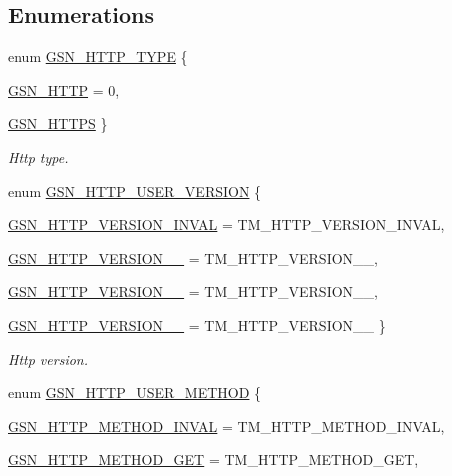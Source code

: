 \subsection*{Enumerations}
\begin{DoxyCompactItemize}
\item 
enum \hyperlink{a00665_ga918ab72c19100d330e6d4854b0ac0612}{GSN\_\-HTTP\_\-TYPE} \{ \par
\hyperlink{a00665_gga918ab72c19100d330e6d4854b0ac0612ad5a7b6c3a067d880ff872f888605566a}{GSN\_\-HTTP} =  0, 
\par
\hyperlink{a00665_gga918ab72c19100d330e6d4854b0ac0612a6f80dcbc6ec710a3a2eee0b1708a4f31}{GSN\_\-HTTPS}
 \}
\begin{DoxyCompactList}\small\item\em Http type. \end{DoxyCompactList}\item 
enum \hyperlink{a00665_ga91d9306148208fe7d577c525bc69fb3b}{GSN\_\-HTTP\_\-USER\_\-VERSION} \{ \par
\hyperlink{a00665_gga91d9306148208fe7d577c525bc69fb3baf9cfc0ba598908f2ac7fab810fc9cadd}{GSN\_\-HTTP\_\-VERSION\_\-INVAL} =  TM\_\-HTTP\_\-VERSION\_\-INVAL, 
\par
\hyperlink{a00665_gga91d9306148208fe7d577c525bc69fb3bad3d536f3c887d1afaa75dab1b08c4c0e}{GSN\_\-HTTP\_\-VERSION\_\_} =  TM\_\-HTTP\_\-VERSION\_\_, 
\par
\hyperlink{a00665_gga91d9306148208fe7d577c525bc69fb3ba098eec93f90919d1eb1c7ca06ea3f7cb}{GSN\_\-HTTP\_\-VERSION\_\_} =  TM\_\-HTTP\_\-VERSION\_\_, 
\par
\hyperlink{a00665_gga91d9306148208fe7d577c525bc69fb3babb3791e6d15e2dfc0cf2411b7c78d9f5}{GSN\_\-HTTP\_\-VERSION\_\_} =  TM\_\-HTTP\_\-VERSION\_\_
 \}
\begin{DoxyCompactList}\small\item\em Http version. \end{DoxyCompactList}\item 
enum \hyperlink{a00665_ga23245efd9f2c5fead55d4b1f075bd6bf}{GSN\_\-HTTP\_\-USER\_\-METHOD} \{ \par
\hyperlink{a00665_gga23245efd9f2c5fead55d4b1f075bd6bfa62b503fb340f576919bded9653868e69}{GSN\_\-HTTP\_\-METHOD\_\-INVAL} =  TM\_\-HTTP\_\-METHOD\_\-INVAL, 
\par
\hyperlink{a00665_gga23245efd9f2c5fead55d4b1f075bd6bfa07b58e80949a13512a72f1fd80253cc5}{GSN\_\-HTTP\_\-METHOD\_\-GET} =  TM\_\-HTTP\_\-METHOD\_\-GET, 
\par

\end{DoxyCompactItemize}

